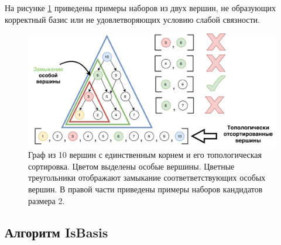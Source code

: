 \documentclass[12pt,a4paper,oneside,openany]{article}
\theoremstyle{definition}
\theoremstyle{lemma}
\theoremstyle{remark}
\begin{document}
На рисунке \ref{fig:candidatesfiltering} приведены примеры наборов из двух вершин, не образующих корректный базис
или не удовлетворяющих условию слабой связности.

\begin{figure}[H]
      \centering
      \includegraphics[width=1.0\linewidth]{images/candidates_filtering.pdf}
      \caption{Граф из 10 вершин с единственным корнем и его топологическая сортировка. Цветом выделены особые вершины.
Цветные треугольники отображают замыкание соответветствующих особых вершин. В правой части приведены примеры наборов кандидатов размера 2.}
      \label{fig:candidatesfiltering}
\end{figure}

\subsection{Алгоритм IsBasis}\label{subsec:isbasis}
\end{document}
